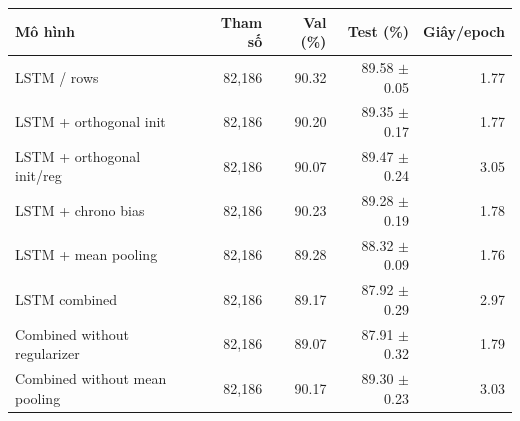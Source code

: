 \begin{tabularx}{\textwidth}{@{}Xrrrr@{}}
\toprule
Mô hình & Tham số & Val (\%) & Test (\%) & Giây/epoch \\
\midrule
LSTM / rows & 82,186 & 90.32 & 89.58 $\pm$ 0.05 & 1.77 \\
LSTM + orthogonal init & 82,186 & 90.20 & 89.35 $\pm$ 0.17 & 1.77 \\
LSTM + orthogonal init/reg & 82,186 & 90.07 & 89.47 $\pm$ 0.24 & 3.05 \\
LSTM + chrono bias & 82,186 & 90.23 & 89.28 $\pm$ 0.19 & 1.78 \\
LSTM + mean pooling & 82,186 & 89.28 & 88.32 $\pm$ 0.09 & 1.76 \\
LSTM combined & 82,186 & 89.17 & 87.92 $\pm$ 0.29 & 2.97 \\
Combined without regularizer & 82,186 & 89.07 & 87.91 $\pm$ 0.32 & 1.79 \\
Combined without mean pooling & 82,186 & 90.17 & 89.30 $\pm$ 0.23 & 3.03 \\
\bottomrule
\end{tabularx}
